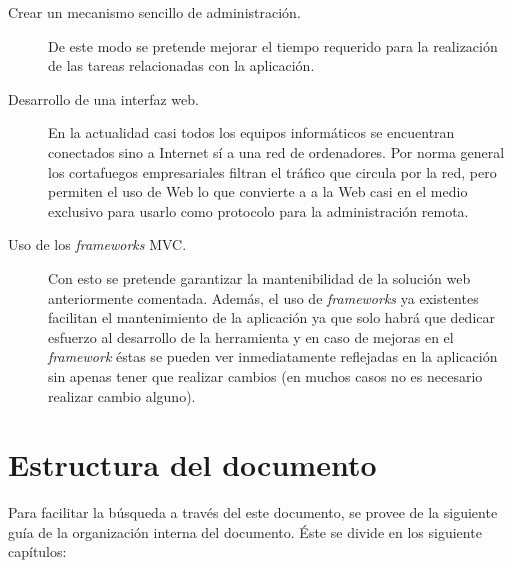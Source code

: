 \begin{description}
	\item[Crear un mecanismo sencillo de administración.] De este modo se pretende mejorar el tiempo requerido para la realización de las tareas relacionadas con la aplicación.
	
	\item[Desarrollo de una interfaz web.] En la actualidad casi todos los equipos informáticos se encuentran conectados sino a Internet sí a una red de ordenadores. Por norma general los cortafuegos empresariales filtran el tráfico que circula por la red, pero permiten el uso de Web lo que convierte a a la Web casi en el medio exclusivo para usarlo como protocolo para la administración remota.
	
	\item[Uso de los \emph{frameworks} MVC.] Con esto se pretende garantizar la mantenibilidad de la solución web anteriormente comentada. Además, el uso de \emph{frameworks} ya existentes facilitan el mantenimiento de la aplicación ya que solo habrá que dedicar esfuerzo al desarrollo de la herramienta y en caso de mejoras en el \emph{framework} éstas se pueden ver inmediatamente reflejadas en la aplicación sin apenas tener que realizar cambios (en muchos casos no es necesario realizar cambio alguno).
\end{description}

\section{Estructura del documento}

Para facilitar la búsqueda a través del este documento, se provee de la siguiente guía de la organización interna del documento. Éste se divide en los siguiente capítulos:

